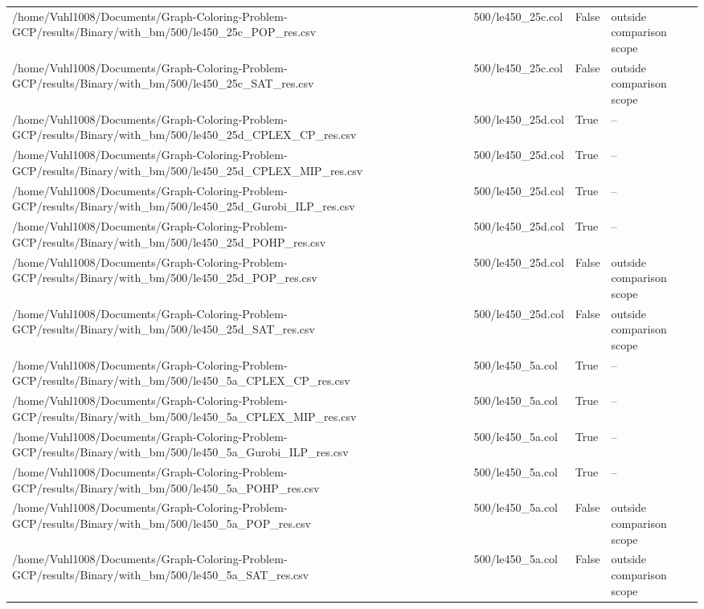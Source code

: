 \begin{table}[htbp]
\begin{tabular}{llll}
/home/Vuhl1008/Documents/Graph-Coloring-Problem-GCP/results/Binary/with\_bm/500/le450\_25c\_POP\_res.csv & 500/le450\_25c.col & False & outside comparison scope \\
/home/Vuhl1008/Documents/Graph-Coloring-Problem-GCP/results/Binary/with\_bm/500/le450\_25c\_SAT\_res.csv & 500/le450\_25c.col & False & outside comparison scope \\
/home/Vuhl1008/Documents/Graph-Coloring-Problem-GCP/results/Binary/with\_bm/500/le450\_25d\_CPLEX\_CP\_res.csv & 500/le450\_25d.col & True & -- \\
/home/Vuhl1008/Documents/Graph-Coloring-Problem-GCP/results/Binary/with\_bm/500/le450\_25d\_CPLEX\_MIP\_res.csv & 500/le450\_25d.col & True & -- \\
/home/Vuhl1008/Documents/Graph-Coloring-Problem-GCP/results/Binary/with\_bm/500/le450\_25d\_Gurobi\_ILP\_res.csv & 500/le450\_25d.col & True & -- \\
/home/Vuhl1008/Documents/Graph-Coloring-Problem-GCP/results/Binary/with\_bm/500/le450\_25d\_POHP\_res.csv & 500/le450\_25d.col & True & -- \\
/home/Vuhl1008/Documents/Graph-Coloring-Problem-GCP/results/Binary/with\_bm/500/le450\_25d\_POP\_res.csv & 500/le450\_25d.col & False & outside comparison scope \\
/home/Vuhl1008/Documents/Graph-Coloring-Problem-GCP/results/Binary/with\_bm/500/le450\_25d\_SAT\_res.csv & 500/le450\_25d.col & False & outside comparison scope \\
/home/Vuhl1008/Documents/Graph-Coloring-Problem-GCP/results/Binary/with\_bm/500/le450\_5a\_CPLEX\_CP\_res.csv & 500/le450\_5a.col & True & -- \\
/home/Vuhl1008/Documents/Graph-Coloring-Problem-GCP/results/Binary/with\_bm/500/le450\_5a\_CPLEX\_MIP\_res.csv & 500/le450\_5a.col & True & -- \\
/home/Vuhl1008/Documents/Graph-Coloring-Problem-GCP/results/Binary/with\_bm/500/le450\_5a\_Gurobi\_ILP\_res.csv & 500/le450\_5a.col & True & -- \\
/home/Vuhl1008/Documents/Graph-Coloring-Problem-GCP/results/Binary/with\_bm/500/le450\_5a\_POHP\_res.csv & 500/le450\_5a.col & True & -- \\
/home/Vuhl1008/Documents/Graph-Coloring-Problem-GCP/results/Binary/with\_bm/500/le450\_5a\_POP\_res.csv & 500/le450\_5a.col & False & outside comparison scope \\
/home/Vuhl1008/Documents/Graph-Coloring-Problem-GCP/results/Binary/with\_bm/500/le450\_5a\_SAT\_res.csv & 500/le450\_5a.col & False & outside comparison scope \\

\end{tabular}
\end{table}
